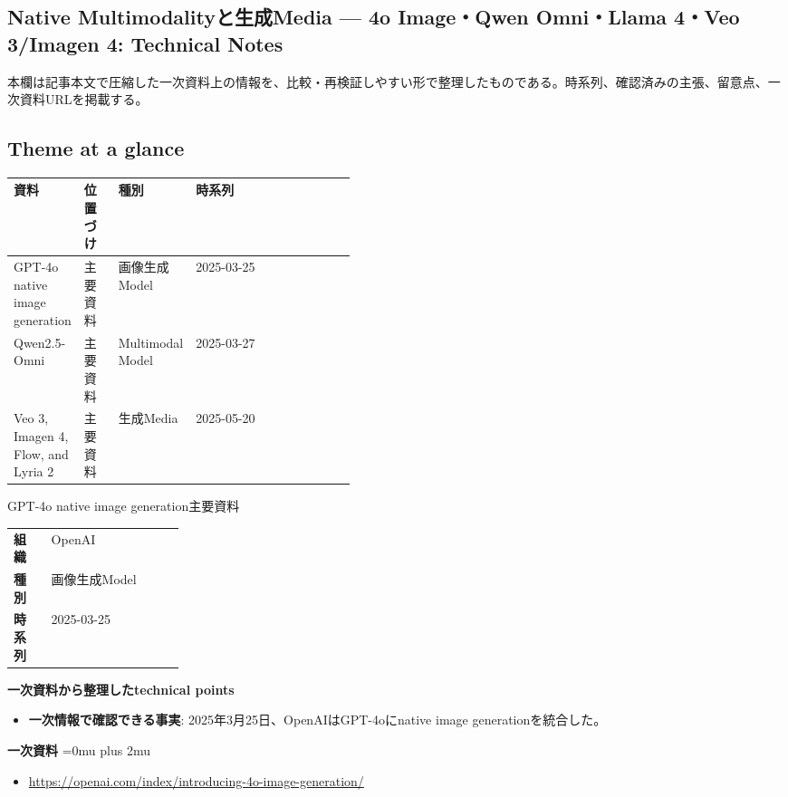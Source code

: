 \subsection*{Native Multimodalityと生成Media — 4o Image・Qwen Omni・Llama 4・Veo 3/Imagen 4: Technical Notes}
本欄は記事本文で圧縮した一次資料上の情報を、比較・再検証しやすい形で整理したものである。時系列、確認済みの主張、留意点、一次資料URLを掲載する。
\medskip
\subsection*{Theme at a glance}
\begin{center}
\footnotesize
\begin{tabularx}{\linewidth}{@{}p{0.20\linewidth}p{0.10\linewidth}p{0.14\linewidth}X@{}}
\toprule
資料 & 位置づけ & 種別 & 時系列 \\
\midrule
GPT-4o native image generation & 主要資料 & 画像生成Model & 2025-03-25   \\
Qwen2.5-Omni & 主要資料 & Multimodal Model & 2025-03-27   \\
Veo 3, Imagen 4, Flow, and Lyria 2 & 主要資料 & 生成Media & 2025-05-20   \\
\bottomrule
\end{tabularx}
\end{center}
\normalsize

\begin{technicalnote}{GPT-4o native image generation}{主要資料}
\begingroup
\begin{tabularx}{\linewidth}{@{}>{\bfseries}p{0.22\linewidth}X@{}}
組織 & OpenAI \\
種別 & 画像生成Model \\
時系列 & 2025-03-25 \\
\end{tabularx}
\smallskip
\begin{minipage}{\linewidth}
{\bfseries 一次資料から整理したtechnical points}
\begin{itemize}[leftmargin=1.5em,itemsep=0.35em]
\item \textbf{一次情報で確認できる事実}: 2025年3月25日、OpenAIはGPT-4oにnative image generationを統合した。
\end{itemize}
\begin{samepage}
{\bfseries 一次資料}
\begingroup\sloppy
\Urlmuskip=0mu plus 2mu\relax
\begin{itemize}[leftmargin=1.5em,itemsep=0.25em]
\item {\scriptsize\url{https://openai.com/index/introducing-4o-image-generation/}}
\end{itemize}
\endgroup
\end{samepage}
\end{minipage}
\endgroup
\end{technicalnote}
\medskip

